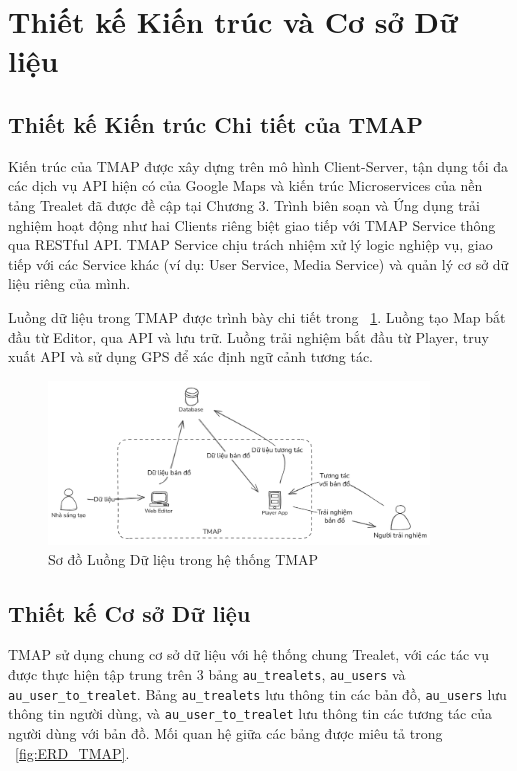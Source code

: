 \section{Thiết kế Kiến trúc và Cơ sở Dữ liệu}

\subsection{Thiết kế Kiến trúc Chi tiết của TMAP}

Kiến trúc của TMAP được xây dựng trên mô hình Client-Server, tận dụng tối đa các dịch vụ API hiện có của Google Maps và kiến trúc Microservices của nền tảng Trealet đã được đề cập tại Chương 3. Trình biên soạn và Ứng dụng trải nghiệm hoạt động như hai Clients riêng biệt giao tiếp với TMAP Service thông qua RESTful API. TMAP Service chịu trách nhiệm xử lý logic nghiệp vụ, giao tiếp với các Service khác (ví dụ: User Service, Media Service) và quản lý cơ sở dữ liệu riêng của mình.

Luồng dữ liệu trong TMAP được trình bày chi tiết trong \figurename~\ref{fig:LuongDuLieuTMAP}. Luồng tạo Map bắt đầu từ Editor, qua API và lưu trữ. Luồng trải nghiệm bắt đầu từ Player, truy xuất API và sử dụng GPS để xác định ngữ cảnh tương tác.

\begin{figure}[h]
    \centering
    \includegraphics[width=0.9\textwidth]{dataflow.png}
    \caption{Sơ đồ Luồng Dữ liệu trong hệ thống TMAP}
    \label{fig:LuongDuLieuTMAP}
\end{figure}

\subsection{Thiết kế Cơ sở Dữ liệu}

TMAP sử dụng chung cơ sở dữ liệu với hệ thống chung Trealet, với các tác vụ được thực hiện tập trung trên 3 bảng \texttt{au\_trealets}, \texttt{au\_users} và \texttt{au\_user\_to\_trealet}. Bảng \texttt{au\_trealets} lưu thông tin các bản đồ, \texttt{au\_users} lưu thông tin người dùng, và \texttt{au\_user\_to\_trealet} lưu thông tin các tương tác của người dùng với bản đồ. Mối quan hệ giữa các bảng được miêu tả trong \figurename~\ref{fig:ERD_TMAP}.

